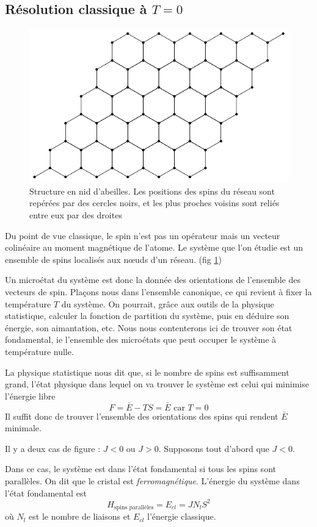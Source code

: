 \documentclass[a4paper, french]{report}
\newcommand{\1}{\ensuremath{\ket{\om_1\bom_1}}\xspace}
\newcommand{\2}{\ensuremath{\ket{\om_2\bom_2}}\xspace}
\begin{document}
\subsection{Résolution classique à $T=0$}
\begin{figure}[htp]
\centering
\includegraphics[scale=1.00]{vector_img/struc_nid_abeilles.pdf}
\caption{Structure en nid d'abeilles. Les positions des spins du réseau sont repérées par des cercles noirs, et les plus proches voisins sont reliés entre eux par des droites}
\label{1}
\end{figure}
Du point de vue classique, le spin n'est pas un opérateur mais un vecteur colinéaire au moment magnétique de l'atome. Le système que l'on étudie est un ensemble de spins localisés aux nœuds d'un réseau. (fig \ref{1})

Un microétat du système est donc la donnée des orientations de l'ensemble des vecteurs de spin. Plaçons nous dans l'ensemble canonique, ce qui revient à fixer la température $T$ du système. On pourrait, grâce aux outils de la physique statistique, calculer la fonction de partition du système, puis en déduire son énergie, son aimantation, etc. Nous nous contenterons ici de trouver son état fondamental, ie l'ensemble des microétats que peut occuper le système à température nulle.

La physique statistique nous dit que, si le nombre de spins est suffisamment grand, l'état physique dans lequel on va trouver le système est celui qui minimise l'énergie libre
\[
	F=\bar{E}-TS=\bar{E} \text{ car }T=0
\]
Il suffit donc de trouver l'ensemble des orientations des spins qui rendent $\bar{E}$ minimale.

Il y a deux cas de figure : $J<0$ ou $J>0$. Supposons tout d'abord que $J<0$.

Dans ce cas, le système est dans l'état fondamental si tous les spins sont parallèles. On dit que le cristal est \emph{ferromagnétique}. L'énergie du système dans l'état fondamental est
\begin{equation}
	H_{\text{spins parallèles}}=E_{cl}=JN_lS^2
\end{equation}
où $N_l$ est le nombre de liaisons et $E_{cl}$ l'énergie classique.
\end{document}
